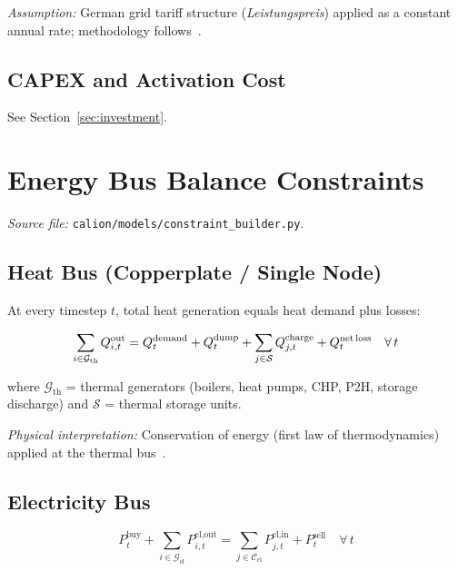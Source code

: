 \documentclass[a4paper,12pt]{article}
\begin{document}
\noindent\textit{Assumption:} German grid tariff structure (\emph{Leistungspreis}) applied as
a constant annual rate; methodology follows~\cite{BNetzA2023}.

\subsection{CAPEX and Activation Cost}

See Section~\ref{sec:investment}.

\section{Energy Bus Balance Constraints}
\label{sec:bus}

\textit{Source file:} \texttt{calion/models/constraint\_builder.py}.

\subsection{Heat Bus (Copperplate / Single Node)}

At every timestep $t$, total heat generation equals heat demand plus losses:

\begin{equation}
  \sum_{i \in \mathcal{G}_{\text{th}}} Q^{\text{out}}_{i,t}
  = Q^{\text{demand}}_{t} + Q^{\text{dump}}_{t}
    + \sum_{j \in \mathcal{S}} Q^{\text{charge}}_{j,t}
    + Q^{\text{net\,loss}}_{t}
  \quad \forall\, t
  \label{eq:heat-bus}
\end{equation}

where $\mathcal{G}_{\text{th}}$ = thermal generators (boilers, heat pumps, CHP, P2H, storage
discharge) and $\mathcal{S}$ = thermal storage units.

\noindent\textit{Physical interpretation:} Conservation of energy (first law of thermodynamics)
applied at the thermal bus~\cite{Lund2014}.

\subsection{Electricity Bus}

\begin{equation}
  P^{\text{buy}}_{t} + \sum_{i \in \mathcal{G}_{\text{el}}} P^{\text{el,out}}_{i,t}
  = \sum_{j \in \mathcal{C}_{\text{el}}} P^{\text{el,in}}_{j,t} + P^{\text{sell}}_{t}
  \quad \forall\, t
  \label{eq:el-bus}
\end{equation}
\end{document}
